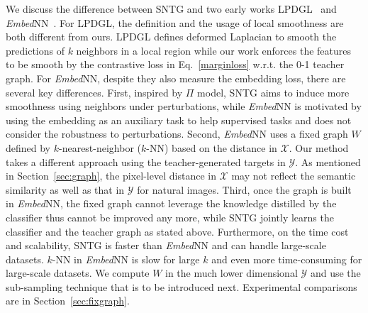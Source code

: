 \documentclass[10pt,twocolumn,letterpaper]{article}
\begin{document}
We discuss the difference between SNTG and two early works LPDGL~\cite{gong2015deformed} and \emph{Embed}NN~\cite{weston2008deep}.
For LPDGL, the definition and the usage of local smoothness are both different from ours. LPDGL defines deformed Laplacian to smooth the predictions of $k$ neighbors in a local region while our work enforces the features to be smooth by the contrastive loss in Eq.~\eqref{marginloss} w.r.t. the 0-1 teacher graph.
For \emph{Embed}NN, despite they also measure the embedding loss, there are several key differences.
First, inspired by $\Pi$ model, SNTG aims to induce more smoothness using neighbors under perturbations, while \emph{Embed}NN is motivated by using the embedding as an auxiliary task to help supervised tasks and does not consider the robustness to perturbations. Second, \emph{Embed}NN uses a fixed graph $W$ defined by $k$-nearest-neighbor ($k$-NN) based on the distance in $\mathcal{X}$. Our method takes a different approach using the teacher-generated targets in $\mathcal{Y}$. As mentioned in Section~\ref{sec:graph}, the pixel-level distance in $\mathcal{X}$ may not reflect the semantic similarity as well as that in $\mathcal{Y}$ for natural images. Third, once the graph is built in \emph{Embed}NN, the fixed graph cannot leverage the knowledge distilled by the classifier thus cannot be improved any more, while SNTG jointly learns the classifier and the teacher graph as stated above. Furthermore, on the time cost and scalability, SNTG is faster than \emph{Embed}NN and can handle large-scale datasets. $k$-NN in \emph{Embed}NN is slow for large $k$ and even more time-consuming for large-scale datasets. We compute $W$ in the much lower dimensional $\mathcal{Y}$ and use the sub-sampling technique that is to be introduced next. Experimental comparisons are in Section~\ref{sec:fixgraph}.
\end{document}
